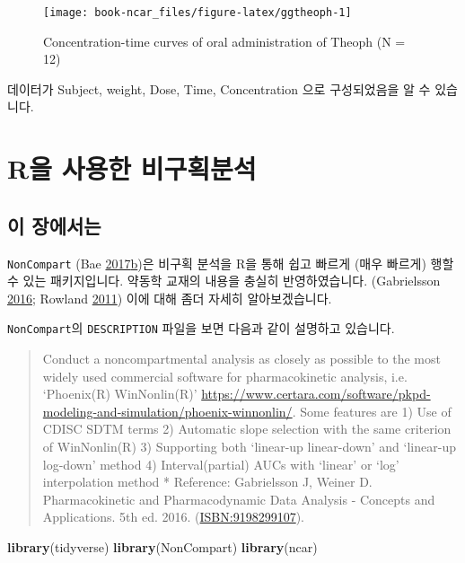 \documentclass[12pt,]{krantz}
\newenvironment{Shaded}{\begin{snugshade}}{\end{snugshade}}
\newcommand{\KeywordTok}[1]{\textcolor[rgb]{0.13,0.29,0.53}{\textbf{#1}}}
\newcommand{\NormalTok}[1]{#1}
\theoremstyle{definition}
\theoremstyle{definition}
\theoremstyle{definition}
\theoremstyle{remark}
\begin{document}
\begin{figure}
\texttt{[image: book-ncar\_files/figure-latex/ggtheoph-1]} \caption{Concentration-time curves of oral administration of Theoph (N = 12)}\label{fig:ggtheoph}
\end{figure}

데이터가 Subject, weight, Dose, Time, Concentration 으로 구성되었음을 알
수 있습니다.

\chapter{R을 사용한 비구획분석}\label{noncompart}

\section{이 장에서는}\label{summary-noncompart}

\texttt{NonCompart} (Bae
\protect\hyperlink{ref-R-NonCompart}{2017}\protect\hyperlink{ref-R-NonCompart}{b})은
비구획 분석을 R을 통해 쉽고 빠르게 (매우 빠르게) 행할 수 있는
패키지입니다. 약동학 교재의 내용을 충실히 반영하였습니다. (Gabrielsson
\protect\hyperlink{ref-gab}{2016}; Rowland
\protect\hyperlink{ref-tozer}{2011}) 이에 대해 좀더 자세히
알아보겠습니다.

\texttt{NonCompart}의 \texttt{DESCRIPTION} 파일을 보면 다음과 같이
설명하고 있습니다.

\begin{quote}
Conduct a noncompartmental analysis as closely as possible to the most
widely used commercial software for pharmacokinetic analysis, i.e.
`Phoenix(R) WinNonlin(R)'
\url{https://www.certara.com/software/pkpd-modeling-and-simulation/phoenix-winnonlin/}.
Some features are 1) Use of CDISC SDTM terms 2) Automatic slope
selection with the same criterion of WinNonlin(R) 3) Supporting both
`linear-up linear-down' and `linear-up log-down' method 4)
Interval(partial) AUCs with `linear' or `log' interpolation method *
Reference: Gabrielsson J, Weiner D. Pharmacokinetic and Pharmacodynamic
Data Analysis - Concepts and Applications. 5th ed. 2016.
(\url{ISBN:9198299107}).
\end{quote}

\begin{Shaded}
\begin{Highlighting}[]
\KeywordTok{library}\NormalTok{(tidyverse)}
\KeywordTok{library}\NormalTok{(NonCompart)}
\KeywordTok{library}\NormalTok{(ncar)}
\end{Highlighting}
\end{Shaded}
\end{document}
